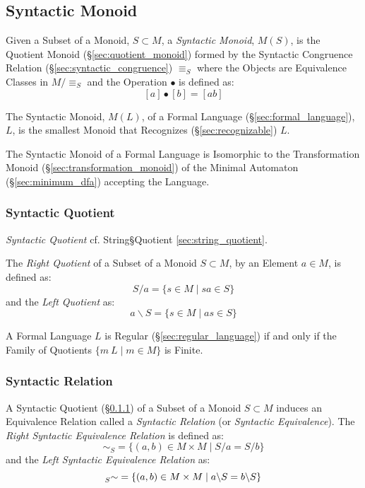 \subsection{Syntactic Monoid}\label{sec:syntactic_monoid}

Given a Subset of a Monoid, $S \subset M$, a \emph{Syntactic Monoid},
$M(S)$, is the Quotient Monoid (\S\ref{sec:quotient_monoid}) formed by
the Syntactic Congruence Relation (\S\ref{sec:syntactic_congruence})
$\equiv_S$ where the Objects are Equivalence Classes in $M / \equiv_S$
and the Operation $\bullet$ is defined as:
\[
  [a] \bullet [b] = [ab]
\]

The Syntactic Monoid, $M(L)$, of a Formal Language
(\S\ref{sec:formal_language}), $L$, is the smallest Monoid that
Recognizes (\S\ref{sec:recognizable}) $L$.

The Syntactic Monoid of a Formal Language is Isomorphic to the
Transformation Monoid (\S\ref{sec:transformation_monoid}) of the
Minimal Automaton (\S\ref{sec:minimum_dfa}) accepting the Language.



\subsubsection{Syntactic Quotient}\label{sec:syntactic_quotient}

\emph{Syntactic Quotient} cf. String\S Quotient
\ref{sec:string_quotient}.

The \emph{Right Quotient} of a Subset of a Monoid $S \subset M$, by an
Element $a \in M$, is defined as:
\[
  S / a = \{ s \in M\;|\;sa \in S \}
\]
and the \emph{Left Quotient} as:
\[
  a \backslash S = \{ s \in M\;|\;as \in S \}
\]

A Formal Language $L$ is Regular (\S\ref{sec:regular_language}) if and
only if the Family of Quotients $\{ m \ L \;|\; m \in M \}$ is Finite.



\subsubsection{Syntactic Relation}\label{sec:syntactic_relation}

A Syntactic Quotient (\S\ref{sec:syntactic_quotient}) of a Subset of a
Monoid $S \subset M$ induces an Equivalence Relation called a
\emph{Syntactic Relation} (or \emph{Syntactic Equivalence}). The
\emph{Right Syntactic Equivalence Relation} is defined as:
\[
  \sim_S = \{ (a,b) \in M \times M \;|\; S/a = S/b\}
\]
and the \emph{Left Syntactic Equivalence Relation} as:
\[
  \prescript{}{S}{\sim} = \{ (a,b) \in M \times M \;|\;
  a \backslash S = b \backslash S \}
\]



